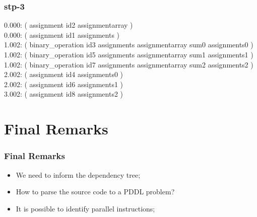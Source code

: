 \documentclass{beamer}
\begin{document}
\begin{frame}
  \frametitle{stp-3}

  {\scriptsize
    0.000: ( assignment id2 assignmentarray )\\
    0.000: ( assignment id1 assignments )\\
    1.002: ( binary\_operation id3 assignments assignmentarray sum0 assignments0 )\\
    1.002: ( binary\_operation id5 assignments assignmentarray sum1 assignments1 )\\
    1.002: ( binary\_operation id7 assignments assignmentarray sum2 assignments2 )\\
    2.002: ( assignment id4 assignments0 )\\
    2.002: ( assignment id6 assignments1 )\\
    3.002: ( assignment id8 assignments2 )\\
  }
\end{frame}


\section{Final Remarks}

\begin{frame}
  \frametitle{Final Remarks}

  \begin{itemize}
    \item We need to inform the dependency tree;
    \item How to parse the source code to a PDDL problem?
    \item It is possible to identify parallel instructions;
  \end{itemize}
\end{frame}
\end{document}
